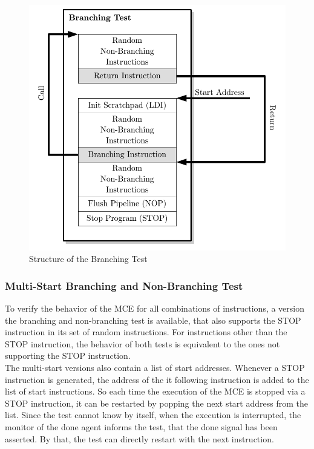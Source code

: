 \begin{figure}[htb]
 \centering
 \includegraphics[scale=1.0]{images/branching_test}
 \caption{Structure of the Branching Test}
\label{fig:branching_test}
\end{figure}

\subsubsection{Multi-Start Branching and Non-Branching Test}

To verify the behavior of the MCE  for all combinations of instructions, a version the branching and non-branching test is available, that also supports the
STOP instruction in its set of random instructions. For instructions other than the STOP instruction, the behavior of both tests is equivalent to the ones not
supporting the STOP instruction.\\
The multi-start versions also contain a list of start addresses. 
Whenever a STOP instruction is generated, the address of the it following instruction is added to the list of start instructions.
So each time the execution of the MCE is stopped via a STOP instruction, it can be restarted by popping the next start address from the list.
Since the test cannot know by itself, when the execution is interrupted, the monitor of the done agent informs the test, that the done signal has been asserted.
By that, the test can directly restart with the next instruction.

